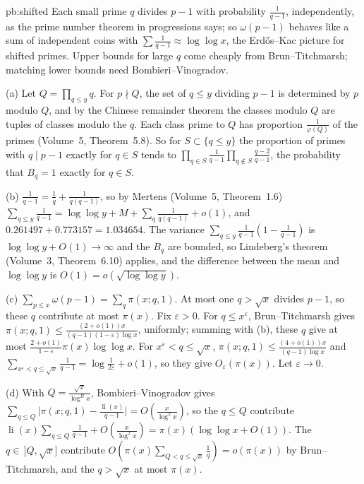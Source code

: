 \begin{solution}{pb:shifted}
\idea Each small prime $q$ divides $p-1$ with probability $\frac1{q-1}$, independently, as the prime number theorem in progressions says; so $\omega(p-1)$ behaves like a sum of independent
coins with $\sum\frac1{q-1}\approx\log\log x$, the Erd\H os--Kac picture for shifted primes. Upper bounds for large $q$ come cheaply from Brun--Titchmarsh; matching lower bounds
need Bombieri--Vinogradov.

\writeup (a) Let $Q=\prod_{q\le y}q$. For $p\nmid Q$, the set of $q\le y$ dividing $p-1$ is determined by $p$ modulo $Q$, and by the Chinese remainder theorem the classes modulo $Q$ are
tuples of classes modulo the $q$. Each class prime to $Q$ has proportion $\frac1{\varphi(Q)}$ of the primes (Volume~5, Theorem~5.8). So for $S\subset\{q\le y\}$ the proportion of primes with
$q\mid p-1$ exactly for $q\in S$ tends to $\prod_{q\in S}\frac1{q-1}\prod_{q\notin S}\frac{q-2}{q-1}$, the probability that $B_q=1$ exactly for $q\in S$.

(b) $\frac1{q-1}=\frac1q+\frac1{q(q-1)}$, so by Mertens (Volume~5, Theorem~1.6) $\sum_{q\le y}\frac1{q-1}=\log\log y+M+\sum_q\frac1{q(q-1)}+o(1)$, and
$0.261497+0.773157=1.034654$. The variance $\sum_{q\le y}\frac1{q-1}(1-\frac1{q-1})$ is $\log\log y+O(1)\to\infty$ and the $B_q$ are bounded, so Lindeberg's theorem (Volume~3,
Theorem~6.10) applies, and the difference between the mean and $\log\log y$ is $O(1)=o(\sqrt{\log\log y})$.

(c) $\sum_{p\le x}\omega(p-1)=\sum_q\pi(x;q,1)$. At most one $q>\sqrt x$ divides $p-1$, so these $q$ contribute at most $\pi(x)$. Fix $\varepsilon>0$. For $q\le x^\varepsilon$,
Brun--Titchmarsh gives $\pi(x;q,1)\le\frac{(2+o(1))x}{(q-1)(1-\varepsilon)\log x}$, uniformly; summing with (b), these $q$ give at most $\frac{2+o(1)}{1-\varepsilon}\pi(x)\log\log x$. For
$x^\varepsilon<q\le\sqrt x$, $\pi(x;q,1)\le\frac{(4+o(1))x}{(q-1)\log x}$ and $\sum_{x^\varepsilon<q\le\sqrt x}\frac1{q-1}=\log\frac1{2\varepsilon}+o(1)$, so they give $O_\varepsilon(\pi(x))$. Let $\varepsilon\to0$.

(d) With $Q=\frac{\sqrt x}{\log^Bx}$, Bombieri--Vinogradov gives $\sum_{q\le Q}\bigl|\pi(x;q,1)-\frac{\operatorname{li}(x)}{q-1}\bigr|=O(\frac x{\log^2x})$, so the $q\le Q$ contribute
$\operatorname{li}(x)\sum_{q\le Q}\frac1{q-1}+O(\frac x{\log^2x})=\pi(x)(\log\log x+O(1))$. The $q\in\,]Q,\sqrt x]$ contribute $O(\pi(x)\sum_{Q<q\le\sqrt x}\frac1q)=o(\pi(x))$ by Brun--Titchmarsh, and the
$q>\sqrt x$ at most $\pi(x)$.


\end{solution}
